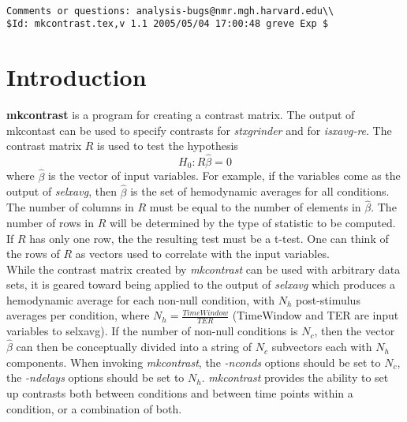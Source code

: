 \documentclass[10pt]{article}
\begin{document}
\begin{Large}
 \\
\end{Large}

\noindent 
\begin{verbatim}
Comments or questions: analysis-bugs@nmr.mgh.harvard.edu\\
$Id: mkcontrast.tex,v 1.1 2005/05/04 17:00:48 greve Exp $
\end{verbatim}

\section{Introduction}

{\bf mkcontrast} is a program for creating a contrast matrix. The
output of mkcontast can be used to specify contrasts for {\em
stxgrinder} and for {\em isxavg-re}. The contrast matrix $R$ is used
to test the hypothesis
\begin{equation}
H_0: R \hat{\beta} = 0
\end{equation}
where $\hat{\beta}$ is the vector of input variables.  For example, if
the variables come as the output of {\em selxavg}, then $\hat{\beta}$
is the set of hemodynamic averages for all conditions.  The number of
columns in $R$ must be equal to the number of elements in
$\hat{\beta}$. The number of rows in $R$ will be determined by the
type of statistic to be computed.  If $R$ has only one row, the the
resulting test must be a t-test.  One can think of the rows of $R$ as
vectors used to correlate with the input variables.\\

While the contrast matrix created by {\em mkcontrast} can be used with
arbitrary data sets, it is geared toward being applied to the output
of {\em selxavg} which produces a hemodynamic average for each
non-null condition, with $N_h$ post-stimulus averages per condition,
where $N_h = \frac{TimeWindow}{TER}$ (TimeWindow and TER are input
variables to selxavg).  If the number of non-null conditions is $N_c$,
then the vector $\hat{\beta}$ can then be conceptually divided into a
string of $N_c$ subvectors each with $N_h$ components.  When invoking
{\em mkcontrast}, the {\em -nconds} options should be set to $N_c$,
the {\em -ndelays} options should be set to $N_h$. {\em mkcontrast}
provides the ability to set up contrasts both between conditions and
between time points within a condition, or a combination of both.\\
\end{document}
